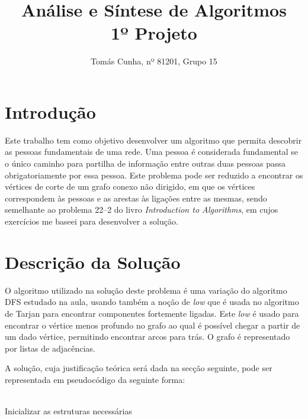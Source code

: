 \documentclass[12pt,a4paper,notitlepage]{article}
\begin{document}
\title{\textbf{Análise e Síntese de Algoritmos} \\\large 1º Projeto}
\date{}
\author{Tomás Cunha, nº 81201, Grupo 15}
\maketitle
\section{Introdução}
Este trabalho tem como objetivo desenvolver um algoritmo que permita descobrir as pessoas fundamentais de uma rede.
Uma pessoa é considerada fundamental se o único caminho para partilha de informação entre outras duas pessoas passa obrigatoriamente por essa pessoa.
Este problema pode ser reduzido a encontrar os vértices de corte de um grafo conexo não dirigido, em que os vértices correspondem às pessoas e as arestas às ligações entre as mesmas, sendo semelhante ao problema 22--2 do livro \emph{Introduction to Algorithms}\cite[p.~622]{algs3ed}, em cujos exercícios me baseei para desenvolver a solução.

\section{Descrição da Solução}
O algoritmo utilizado na solução deste problema é uma variação do algoritmo DFS estudado na aula, usando também a noção de \emph{low} que é usada no algoritmo de Tarjan para encontrar componentes fortemente ligadas.
Este \emph{low} é usado para encontrar o vértice menos profundo no grafo ao qual é possível chegar a partir de um dado vértice, permitindo encontrar arcos para trás.
O grafo é representado por listas de adjacências.

A solução, cuja justificação teórica será dada na secção seguinte, pode ser representada em pseudocódigo da seguinte forma:
\\
\\
\begin{algorithm}[H]


		\caption{Inicializar as estruturas necessárias}
\end{algorithm}
\end{document}
